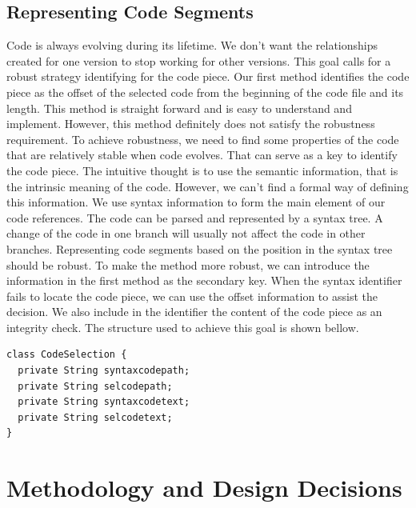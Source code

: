 \documentclass[11pt,letterpaper,oneside]{article}
\begin{document}
\subsection{Representing Code Segments}
Code is always evolving during its lifetime.
We don't want the relationships created for one version to stop working for other versions.
This goal calls for a robust strategy identifying for the code piece.
Our first method identifies the code piece as the offset of the selected code from the beginning of the code file and its length.
This method is straight forward and is easy to understand and implement.
However, this method definitely does not satisfy the robustness requirement.
To achieve robustness, we need to find some properties of the code that are relatively stable when code evolves.
That can serve as a key to identify the code piece.
The intuitive thought is to use the semantic information,
that is the intrinsic meaning of the code.
However, we can't find a formal way of defining this information.
We use syntax information to form the main element of our code references.
The code can be parsed and represented by a syntax tree.
A change of the code in one branch will usually not affect the code in other branches.
Representing code segments based on the position in the syntax tree should be robust.
To make the method more robust, %
we can introduce the information in the first method as the secondary key.
When the syntax identifier fails to locate the code piece,
we can use the offset information to assist the decision.
We also include in the identifier the content of the code piece as an integrity check.
The structure used to achieve this goal is shown bellow.
\begin{Verbatim}[frame=single]
class CodeSelection {
  private String syntaxcodepath;
  private String selcodepath;
  private String syntaxcodetext;
  private String selcodetext;
}
\end{Verbatim}


\section{Methodology and Design Decisions}
\label{sec:decision}
\end{document}
